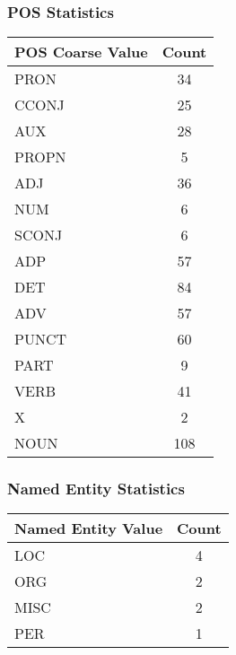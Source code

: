 \documentclass{article}
\begin{document}
\subsubsection*{POS Statistics}
\begin{tabular}{|l|c|}
\hline
\textbf{POS Coarse Value} & \textbf{Count} \\
\hline
PRON & 34 \\
\hline
CCONJ & 25 \\
\hline
AUX & 28 \\
\hline
PROPN & 5 \\
\hline
ADJ & 36 \\
\hline
NUM & 6 \\
\hline
SCONJ & 6 \\
\hline
ADP & 57 \\
\hline
DET & 84 \\
\hline
ADV & 57 \\
\hline
PUNCT & 60 \\
\hline
PART & 9 \\
\hline
VERB & 41 \\
\hline
X & 2 \\
\hline
NOUN & 108 \\
\hline
\end{tabular}
\subsubsection*{Named Entity Statistics}
\begin{tabular}{|l|c|}
\hline
\textbf{Named Entity Value} & \textbf{Count} \\
\hline
LOC & 4 \\
\hline
ORG & 2 \\
\hline
MISC & 2 \\
\hline
PER & 1 \\
\hline
\end{tabular}
\end{document}
